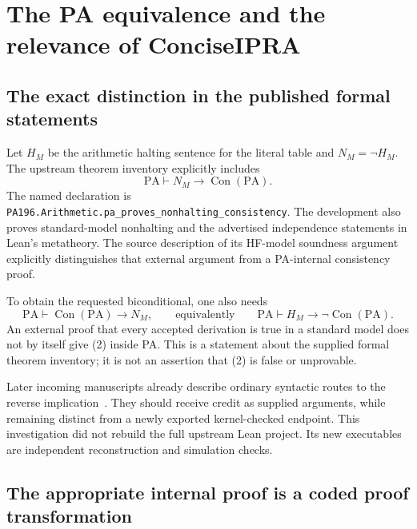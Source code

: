 \documentclass[11pt,letterpaper]{article}
\newcommand{\PA}{\mathrm{PA}}
\newcommand{\Con}{\operatorname{Con}}
\newcommand{\code}[1]{\texttt{\nolinkurl{#1}}}
\begin{document}
\section{The PA equivalence and the relevance of ConciseIPRA}

\subsection{The exact distinction in the published formal statements}

Let \(H_M\) be the arithmetic halting sentence for the literal table and
\(N_M=\neg H_M\). The upstream theorem inventory explicitly includes
\[
 \PA\vdash N_M\to\Con(\PA).
\tag{1}
\]
The named declaration is~\cite{pa196}
\code{PA196.Arithmetic.pa_proves_nonhalting_consistency}.
The development also proves standard-model nonhalting and the advertised
independence statements in Lean's metatheory. The source description of
its HF-model soundness argument explicitly distinguishes that external
argument from a PA-internal consistency proof.

To obtain the requested biconditional, one also needs
\[
 \PA\vdash\Con(\PA)\to N_M,
\qquad\text{equivalently}\qquad
 \PA\vdash H_M\to\neg\Con(\PA).
\tag{2}
\]
An external proof that every accepted derivation is true in a standard
model does not by itself give (2) inside PA. This is a statement about
the supplied formal theorem inventory; it is not an assertion that
(2) is false or unprovable.

Later incoming manuscripts already describe ordinary syntactic routes
to the reverse implication~\cite{incoming,comparison}. They should receive credit as supplied
arguments, while remaining distinct from a newly exported kernel-checked
endpoint. This investigation did not rebuild the full upstream Lean
project. Its new executables are independent reconstruction and
simulation checks.

\subsection{The appropriate internal proof is a coded proof transformation}
\end{document}
